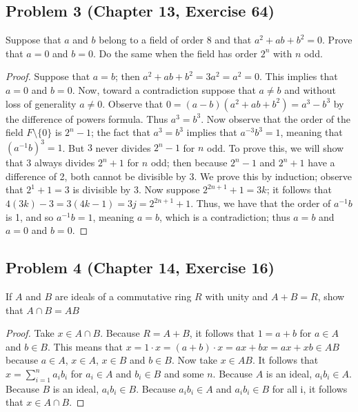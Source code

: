 \documentclass{article}
\begin{document}
\subsection*{Problem 3 (Chapter 13, Exercise 64)}
Suppose that $a$ and $b$ belong to a field of order $8$ and that $a^2 + ab + b^2 = 0$. Prove that $a = 0$ and $b = 0$. Do the same when the field has order $2^n$ with $n$ odd.
\begin{proof}
Suppose that $a = b$; then $a^2 + ab + b^2 = 3a^2 = a^2 = 0$. This implies that $a = 0$ and $b = 0$. Now, toward a contradiction suppose that $a \neq b$ and without loss of generality $a \neq 0$. Observe that $0 = (a-b)(a^2+ab+b^2) = a^3 - b^3$ by the difference of powers formula. Thus $a^3 = b^3$. Now observe that the order of the field $F \setminus \{0\}$ is $2^n - 1$; the fact that $a^3 = b^3$ implies that $a^{-3}b^3 = 1$, meaning that $(a^{-1}b)^3 = 1$. But $3$ never divides $2^n - 1$ for $n$ odd. To prove this, we will show that $3$ always divides $2^n + 1$ for $n$ odd; then because $2^n - 1$ and $2^n + 1$ have a difference of 2, both cannot be divisible by $3$. We prove this by induction; observe that $2^1 + 1 = 3$ is divisible by $3$. Now suppose $2^{2n+1} + 1 = 3k$; it follows that $4(3k) - 3 = 3(4k - 1) = 3j = 2^{2n+1} + 1$. Thus, we have that the order of $a^{-1}b$ is 1, and so $a^{-1}b = 1$, meaning $a = b$, which is a contradiction; thus $a = b$ and $a = 0$ and $b = 0$.
\end{proof}

\subsection*{Problem 4 (Chapter 14, Exercise 16)}
If $A$ and $B$ are ideals of a commutative ring $R$ with unity and $A + B = R$, show that $A \cap B = AB$
\begin{proof} 
Take $x \in A \cap B$. Because $R = A + B$, it follows that $1 = a + b$ for $a \in A$ and $b \in B$. This means that $x = 1 \cdot x = (a + b) \cdot x = ax + bx = ax + xb \in AB$ because $a \in A$, $x \in A$, $x \in B$ and $b \in B$. Now take $x \in AB$. It follows that $x = \sum_{i=1}^{n} a_ib_i$ for $a_i \in A$ and $b_i \in B$ and some $n$. Because $A$ is an ideal, $a_ib_i \in A$. Because $B$ is an ideal, $a_ib_i \in B$. Because $a_ib_i \in A$ and $a_ib_i \in B$ for all i, it follows that $x \in A \cap B$.
\end{proof}
\end{document}
